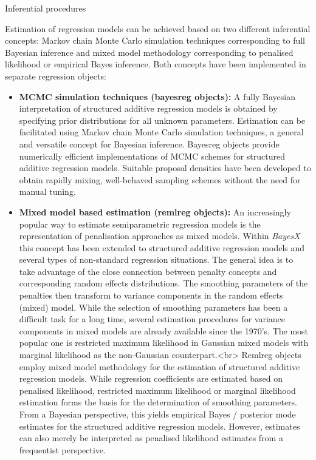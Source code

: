 \begin{stanza}{Inferential procedures}

Estimation of regression models can be achieved based on two
different inferential concepts: Markov chain Monte Carlo
simulation techniques corresponding to full Bayesian inference and
mixed model methodology corresponding to penalised likelihood or
empirical Bayes inference. Both concepts have been implemented in
separate regression objects:

\begin{itemize}
\item {\bf\sffamily MCMC simulation techniques (bayesreg
objects):} A fully Bayesian interpretation of structured additive
regression models is obtained by specifying prior distributions
for all unknown parameters. Estimation can be facilitated using
Markov chain Monte Carlo simulation techniques, a general and
versatile concept for Bayesian inference. Bayesreg objects provide
numerically efficient implementations of MCMC schemes for
structured additive regression models. Suitable proposal densities
have been developed to obtain rapidly mixing, well-behaved
sampling schemes without the need for manual tuning.
\item{\bf\sffamily Mixed model based estimation (remlreg
objects):} An increasingly popular way to estimate semiparametric
regression models is the representation of penalisation approaches
as mixed models. Within {\em BayesX} this concept has been
extended to structured additive regression models and several
types of non-standard regression situations. The general idea is
to take advantage of the close connection between penalty concepts
and corresponding random effects distributions. The smoothing
parameters of the penalties then transform to variance components
in the random effects (mixed) model. While the selection of
smoothing parameters has been a difficult task for a long time,
several estimation procedures for variance components in mixed
models are already available since the 1970's. The most popular
one is restricted maximum likelihood in Gaussian mixed models with
marginal likelihood as the non-Gaussian counterpart.<br> Remlreg
objects employ mixed model methodology for the estimation of
structured additive regression models. While regression
coefficients are estimated based on penalised likelihood,
restricted maximum likelihood or marginal likelihood estimation
forms the basis for the determination of smoothing parameters.
From a Bayesian perspective, this yields empirical Bayes /
posterior mode estimates for the structured additive regression
models. However, estimates can also merely be interpreted as
penalised likelihood estimates from a frequentist perspective.
\end{itemize}
\end{stanza}



